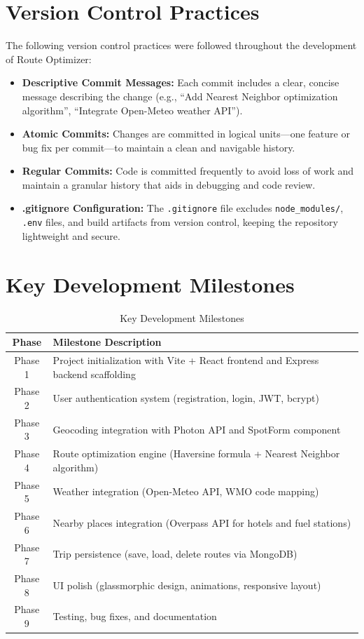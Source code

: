 \section{Version Control Practices}
The following version control practices were followed throughout the development of Route Optimizer:
\begin{itemize}
    \item \textbf{Descriptive Commit Messages:} Each commit includes a clear, concise message describing the change (e.g., ``Add Nearest Neighbor optimization algorithm'', ``Integrate Open-Meteo weather API'').
    \item \textbf{Atomic Commits:} Changes are committed in logical units---one feature or bug fix per commit---to maintain a clean and navigable history.
    \item \textbf{Regular Commits:} Code is committed frequently to avoid loss of work and maintain a granular history that aids in debugging and code review.
    \item \textbf{.gitignore Configuration:} The \texttt{.gitignore} file excludes \texttt{node\_modules/}, \texttt{.env} files, and build artifacts from version control, keeping the repository lightweight and secure.
\end{itemize}

\section{Key Development Milestones}
\begin{table}[H]
    \centering
    \renewcommand{\arraystretch}{1.3}
    \begin{tabular}{|c|p{8cm}|}
        \hline
        \textbf{Phase} & \textbf{Milestone Description} \\
        \hline
        Phase 1 & Project initialization with Vite + React frontend and Express backend scaffolding \\
        \hline
        Phase 2 & User authentication system (registration, login, JWT, bcrypt) \\
        \hline
        Phase 3 & Geocoding integration with Photon API and SpotForm component \\
        \hline
        Phase 4 & Route optimization engine (Haversine formula + Nearest Neighbor algorithm) \\
        \hline
        Phase 5 & Weather integration (Open-Meteo API, WMO code mapping) \\
        \hline
        Phase 6 & Nearby places integration (Overpass API for hotels and fuel stations) \\
        \hline
        Phase 7 & Trip persistence (save, load, delete routes via MongoDB) \\
        \hline
        Phase 8 & UI polish (glassmorphic design, animations, responsive layout) \\
        \hline
        Phase 9 & Testing, bug fixes, and documentation \\
        \hline
    \end{tabular}
    \caption{Key Development Milestones}
    \label{tab:milestones}
\end{table}

